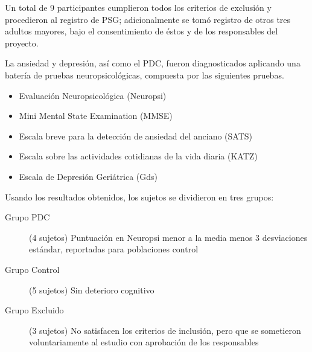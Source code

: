 \documentclass[12pt,a4paper]{mitthesis}
\begin{document}
Un total de 9 participantes cumplieron todos los criterios de exclusi\'on y procedieron al registro 
de PSG; adicionalmente se tom\'o registro de otros tres adultos mayores, bajo
el consentimiento de \'estos y de los responsables del proyecto.

La ansiedad y depresi\'on, as\'i como el PDC, fueron diagnosticados aplicando una bater\'ia de
pruebas neuropsicol\'ogicas, compuesta por las siguientes pruebas. 
%
%
%

\begin{itemize}
\item {Evaluaci\'on Neuropsicol\'ogica (Neuropsi)} \cite{Solis03}
\item {Mini Mental State Examination (MMSE)} \cite{Velasco15}
\item {Escala breve para la detecci\'on de ansiedad del anciano (SATS)} \cite{Vargas11}
\item {Escala sobre las actividades cotidianas de la vida diaria (KATZ)} \cite{Roumec14}
\item {Escala de Depresi\'on Geri\'atrica (Gds)} \cite{Greenberg12,Cuijpers13}
\end{itemize}

Usando los resultados obtenidos, los sujetos se dividieron en tres grupos:
\begin{description}
\item[Grupo PDC] (4 sujetos) Puntuaci\'on en Neuropsi menor a la media menos 3 desviaciones est\'andar, 
reportadas para poblaciones control \cite{Solis03}
\item[Grupo Control] (5 sujetos) Sin deterioro cognitivo
\item[Grupo Excluido] (3 sujetos) No satisfacen los criterios de inclusi\'on, pero que se 
sometieron voluntariamente al estudio con aprobaci\'on de los responsables
\end{description}
\end{document}
